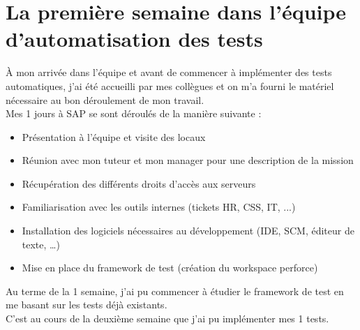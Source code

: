 \section{La premi\`{e}re semaine dans l'\'{e}quipe d'automatisation des tests}
\`{A} mon arriv\'{e}e dans l'\'{e}quipe et avant de commencer \`{a} impl\'{e}menter des tests automatiques, j'ai \'{e}t\'{e} accueilli par mes coll\`{e}gues et on m'a fourni le mat\'{e}riel n\'{e}cessaire au bon d\'{e}roulement de mon travail.\\
Mes 1 jours \`{a} SAP se sont d\'{e}roul\'{e}s de la mani\`{e}re suivante :\\
\begin{itemize}
\item Pr\'{e}sentation \`{a} l'\'{e}quipe et visite des locaux
\item R\'{e}union avec mon tuteur et mon manager pour une description de la mission
\item R\'{e}cup\'{e}ration des diff\'{e}rents droits d'acc\`{e}s aux serveurs
\item Familiarisation avec les outils internes (tickets HR, CSS, IT, ...)
\item Installation des logiciels n\'{e}cessaires au d\'{e}veloppement (IDE, SCM, \'{e}diteur de texte, \ldots)
\item Mise en place du framework de test (cr\'{e}ation du workspace perforce)
\end{itemize}
Au terme de la 1 semaine, j'ai pu commencer \`{a} \'{e}tudier le framework de test en me basant sur les tests d\'{e}j\`{a} existants.\\
C'est au cours de la deuxi\`{e}me semaine que j'ai pu impl\'{e}menter mes 1 tests.

